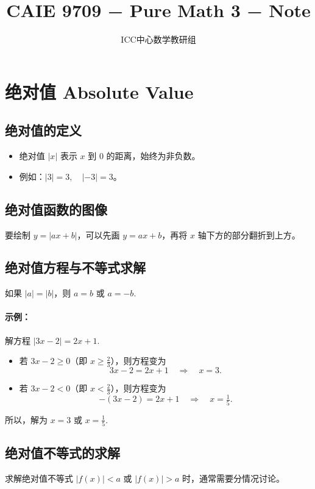 \documentclass[8pt,a4paper,twoside]{tau-class/tau}
\title{CAIE 9709 − Pure Math 3 − Note}
\author[a,1]{ICC中心数学教研组}
\begin{document}
\maketitle
\tableofcontents
\linenumbers

\newpage
\section{绝对值 Absolute Value}

\subsection{绝对值的定义}
\begin{itemize}
    \item 绝对值 \(|x|\) 表示 \(x\) 到 0 的距离，始终为非负数。
    \item 例如：\(|3| = 3,\quad |−3| = 3\)。
\end{itemize}

\subsection{绝对值函数的图像}
要绘制 \(y = |ax + b|\)，可以先画 \(y = ax + b\)，再将 \(x\) 轴下方的部分翻折到上方。
\subsection{绝对值方程与不等式求解}
如果 \(|a| = |b|\)，则 \(a = b\) 或 \(a = −b\).

\paragraph{示例：}
解方程 \(\bigl\lvert 3x − 2\bigr\rvert = 2x + 1\).
\begin{itemize}
    \item 若 \(3x − 2 \geq 0\)（即 \(x \geq \tfrac{2}{3}\)），则方程变为
    \[
        3x − 2 = 2x + 1 
        \quad \Longrightarrow \quad 
        x = 3.
    \]
    \item 若 \(3x − 2 < 0\)（即 \(x < \tfrac{2}{3}\)），则方程变为
    \[
        −(3x − 2) = 2x + 1 
        \quad \Longrightarrow \quad 
        x = \tfrac{1}{5}.
    \]
\end{itemize}
所以，解为 \(x = 3\) 或 \(x = \tfrac{1}{5}\).

\subsection{绝对值不等式的求解}
求解绝对值不等式 \(|f(x)| < a\) 或 \(|f(x)| > a\) 时，通常需要分情况讨论。
\end{document}
